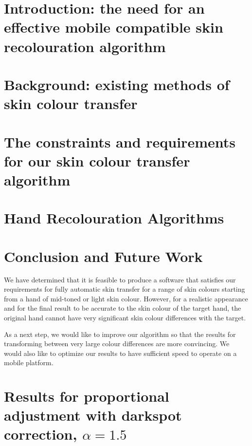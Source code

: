\documentclass[12pt, a4paper]{article}
\begin{document}
\section{Introduction: the need for an effective mobile compatible skin recolouration algorithm}

\pagebreak

\section{Background: existing methods of skin colour transfer}

\pagebreak

\section{The constraints and requirements for our skin colour transfer algorithm \label{sec:goals}}

\pagebreak

\section{Hand Recolouration Algorithms}

\pagebreak

\section{Conclusion and Future Work}
We have determined that it is feasible to produce a software that satisfies our requirements for fully automatic skin transfer for a range of skin colours starting from a hand of mid-toned or light skin colour. However, for a realistic appearance and for the final result to be accurate to the skin colour of the target hand, the original hand cannot have very significant skin colour differences with the target.

As a next step, we would like to improve our algorithm so that the results for transforming between very large colour differences are more convincing. We would also like to optimize our results to have sufficient speed to operate on a mobile platform.
\pagebreak



\pagebreak

\appendix
\section{Results for proportional adjustment with darkspot correction, $\alpha = 1.5$}\label{app:prop_corr_ave_a1p5}

\end{document}
